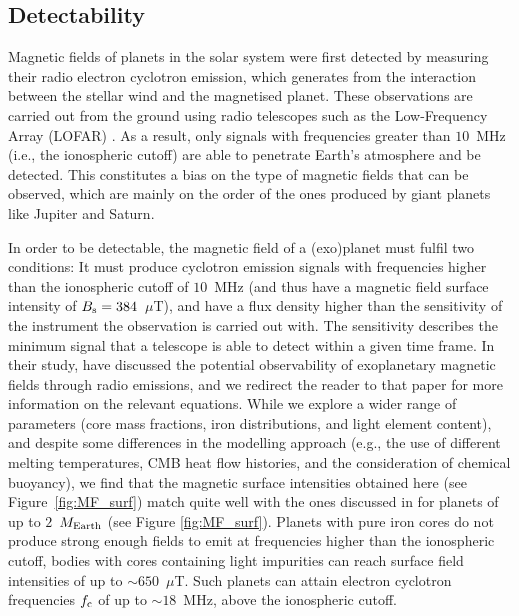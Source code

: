\documentclass[draft]{agujournal2019} %
\begin{document}
\subsection{Detectability} \label{sec:detectability}
Magnetic fields of planets in the solar system were first detected by measuring their radio electron cyclotron emission, which generates from the interaction between the stellar wind and the magnetised planet. These observations are carried out from the ground using radio telescopes such as the Low-Frequency Array (LOFAR) \cite{kassim2004low}. As a result, only signals with frequencies greater than $10$~MHz (i.e., the ionospheric cutoff) are able to penetrate Earth's atmosphere and be detected. This constitutes a bias on the type of magnetic fields that can be observed, which are mainly on the order of the ones produced by giant planets like Jupiter and Saturn. 

In order to be detectable, the magnetic field of a (exo)planet must fulfil two conditions: It must produce cyclotron emission signals with frequencies higher than the ionospheric cutoff of $10$~MHz (and thus have a magnetic field surface intensity of $B_{\rm s}=384$~$\mu$T), and have a flux density higher than the sensitivity of the instrument the observation is carried out with. The sensitivity describes the minimum signal that a telescope is able to detect within a given time frame. In their study,  have discussed the potential observability of exoplanetary magnetic fields through radio emissions, and we redirect the reader to that paper for more information on the relevant equations. While we explore a wider range of parameters (core mass fractions, iron distributions, and light element content), and despite some differences in the modelling approach (e.g., the use of different melting temperatures, CMB heat flow histories, and the consideration of chemical buoyancy), we find that the magnetic surface intensities obtained here (see Figure~\ref{fig:MF_surf}) match quite well with the ones discussed in  for planets of up to $2$~$M_{\rm Earth}$ (see Figure \ref{fig:MF_surf}). Planets with pure iron cores do not produce strong enough fields to emit at frequencies higher than the ionospheric cutoff, bodies with cores containing light impurities can reach surface field intensities of up to $\sim 650$~$\mu$T. Such planets can attain electron cyclotron frequencies $f_{\rm c}$ of up to $\sim 18$~MHz, above the ionospheric cutoff. 
 
\end{document}

